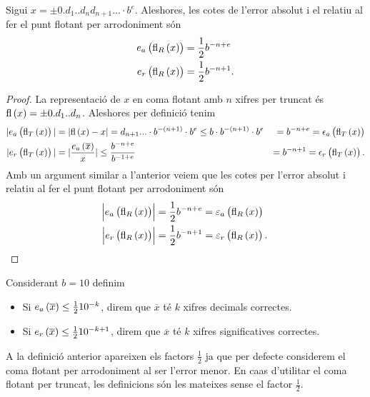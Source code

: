\begin{prop} 
   Sigui $x = \pm 0.d_1..d_nd_{n+1}... \cdot b^e$. Aleshores, les cotes de l'error absolut i el relatiu al fer el punt flotant per arrodoniment són
  \begin{align*}
    e_a\left( \text{fl}_R\left( x\right) \right)  &=  \frac{1}{2}b^{-n+e} \\
    e_r\left( \text{fl}_R\left( x\right) \right)  &=  \frac{1}{2}b^{-n+1}.
  \end{align*}
\end{prop}
\begin{proof}
   La representació de $x$ en coma flotant amb $n$ xifres per truncat és $\text{fl}\left( x\right)  = \pm 0.d_1..d_n$. Aleshores per definició tenim
    \begin{align*}
            |e_a\left( \text{fl}_T\left( x\right) \right) | &= |\text{fl}\left( x\right)  - x| = d_{n+1}... \cdot b^{-\left( n+1\right) } \cdot b^e \leq b \cdot b^{-\left( n+1\right) } \cdot b^e &= b^{-n+e} = \epsilon_a\left( \text{fl}_T\left( x\right) \right)  \\
            |e_r\left( \text{fl}_T\left( x\right) \right) | &= |\frac{e_a\left( \overline{x}\right) }{x}| \leq \frac{b^{-n+e}}{b^{-1+e}} &= b^{-n+1} = \epsilon_r\left( \text{fl}_T\left( x\right) \right).
    \end{align*}
    Amb un argument similar a l'anterior veiem que les cotes per l'error absolut i relatiu al fer el punt flotant per arrodoniment són
    \begin{align*}
            \abs{e_a\left( \text{fl}_R\left( x\right) \right) } &=  \frac{1}{2}b^{-n+e} = \varepsilon_a\left( \text{fl}_R\left( x\right) \right)  \\
            \abs{e_r\left( \text{fl}_R\left( x\right) \right) } &=  \frac{1}{2}b^{-n+1} = \varepsilon_r\left( \text{fl}_R\left( x\right) \right).
    \end{align*}
\end{proof}
 
\begin{defi}
    Considerant $b = 10$ definim
    \begin{itemize}
	\item Si $e_a\left( \overline{x}\right)  \leq \frac{1}{2}10^{-k}$, direm que $\overline{x}$ té $k$ xifres decimals correctes.
	\item Si $e_r\left( \overline{x}\right)  \leq \frac{1}{2}10^{-k+1}$, direm que $\overline{x}$ té $k$ xifres significatives correctes.
    \end{itemize}
\end{defi}

\begin{obs}
  A la definició anterior apareixen els factors $\frac{1}{2}$ ja que per defecte considerem el coma flotant per arrodoniment al ser l'error menor. En caas d'utilitar el coma flotant per truncat, les definicions són les mateixes sense el factor $\frac{1}{2}$.
\end{obs}

